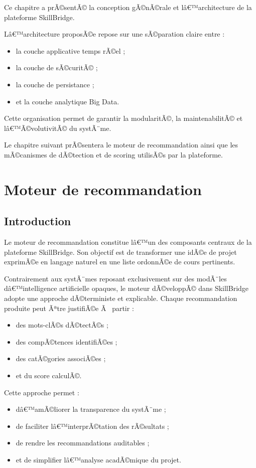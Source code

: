 ﻿\documentclass[12pt,a4paper]{report}
\begin{document}
Ce chapitre a prÃ©sentÃ© la conception gÃ©nÃ©rale et lâ€™architecture de la plateforme SkillBridge.

Lâ€™architecture proposÃ©e repose sur une sÃ©paration claire entre :
\begin{itemize}
    \item la couche applicative temps rÃ©el ;
    \item la couche de sÃ©curitÃ© ;
    \item la couche de persistance ;
    \item et la couche analytique Big Data.
\end{itemize}

Cette organisation permet de garantir la modularitÃ©, la maintenabilitÃ© et lâ€™Ã©volutivitÃ© du systÃ¨me.

Le chapitre suivant prÃ©sentera le moteur de recommandation ainsi que les mÃ©canismes de dÃ©tection et de scoring utilisÃ©s par la plateforme.
\chapter{Moteur de recommandation}

\section{Introduction}

Le moteur de recommandation constitue lâ€™un des composants centraux de la plateforme SkillBridge. Son objectif est de transformer une idÃ©e de projet exprimÃ©e en langage naturel en une liste ordonnÃ©e de cours pertinents.

Contrairement aux systÃ¨mes reposant exclusivement sur des modÃ¨les dâ€™intelligence artificielle opaques, le moteur dÃ©veloppÃ© dans SkillBridge adopte une approche dÃ©terministe et explicable. Chaque recommandation produite peut Ãªtre justifiÃ©e Ã  partir :
\begin{itemize}
    \item des mots-clÃ©s dÃ©tectÃ©s ;
    \item des compÃ©tences identifiÃ©es ;
    \item des catÃ©gories associÃ©es ;
    \item et du score calculÃ©.
\end{itemize}

Cette approche permet :
\begin{itemize}
    \item dâ€™amÃ©liorer la transparence du systÃ¨me ;
    \item de faciliter lâ€™interprÃ©tation des rÃ©sultats ;
    \item de rendre les recommandations auditables ;
    \item et de simplifier lâ€™analyse acadÃ©mique du projet.
\end{itemize}
\end{document}
